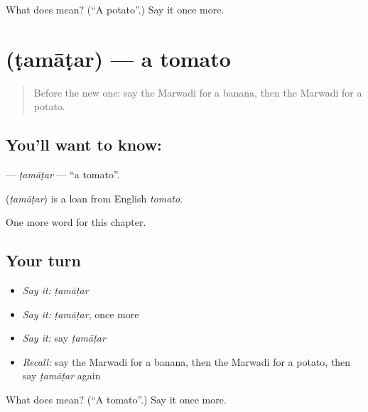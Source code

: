 \begin{tcolorbox}[breakable,colback=teal!4,colframe=teal!35!black,title={Before you move on}]
What does  mean? (\textquotedblleft{}A potato\textquotedblright{}.) Say it once more.
\end{tcolorbox}
\section[\texorpdfstring{\mw{टमाटर} (ṭamāṭar)}{टमाटर (ṭamāṭar)}]{ (ṭamāṭar) — a tomato}

\label{lesson:MW-C59-tamatar}



\begin{quote}
Before the new one: say the Marwadi for a banana, then the Marwadi for a potato.
\end{quote}

\subsection*{You'll want to know: }
\textbf{} — \emph{ṭamāṭar} — \textquotedblleft{}a tomato\textquotedblright{}.

\begin{cousinweb}
\textbf{} (\emph{ṭamāṭar}) is a loan from English \emph{tomato}.
\end{cousinweb}

\begin{grammarlens}[title={What you've built}]
One more word for this chapter.
\end{grammarlens}

\subsection*{Your turn}
\begin{itemize}
\raggedright
  \item \emph{Say it:} \emph{ṭamāṭar}
  \item \emph{Say it:} \emph{ṭamāṭar}, once more
  \item \emph{Say it:} say \emph{ṭamāṭar}
  \item \emph{Recall:} say the Marwadi for a banana, then the Marwadi for a potato, then say \emph{ṭamāṭar} again
\end{itemize}

\begin{tcolorbox}[breakable,colback=teal!4,colframe=teal!35!black,title={Before you move on}]
What does  mean? (\textquotedblleft{}A tomato\textquotedblright{}.) Say it once more.
\end{tcolorbox}

